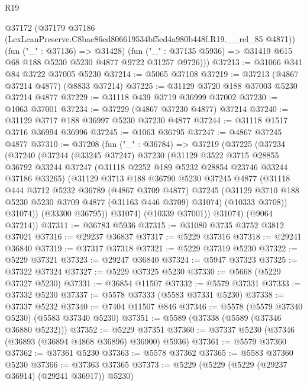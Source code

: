 \begin{lexlean}{R19}
\begin{coremodule}
      @37172
        (@37179 @37186 (LexLeanPreserve.C8bae86ed806619534bf5ed4a980b448f.R19.__rel_85 @4871))
        (fun ("_" : @37136) => @31428)
        (fun ("_" : @37135 @5936) => @31419 @615 @68 @188 @5230 @5230 @4877 @9722 @31257 @9726)))
@37213 := @31066 @341 @84 @3722 @37005 @5230
@37214 := @5065 @37108
@37219 := @37213 (@4867 @37214 @4877) (@8833 @37214)
@37225 := @31129 @3720 @188 @37003 @5230 @37214 @4877
@37229 := @31118 @439 @3719 @36999 @37002
@37230 := @1063 @37001
@37234 := @37229 (@4867 @37230 @4877) @37214
@37240 := @31129 @3717 @188 @36997 @5230 @37230 @4877
@37244 := @31118 @1517 @3716 @36994 @36996
@37245 := @1063 @36795
@37247 := @4867 @37245 @4877
@37310 := @37208
    (fun ("_" : @36784) =>
    @37219
      (@37225
        (@37234
          (@37240
            (@37244
              (@33245 @37247)
              @37230
              (@31129
                @3522
                @3715
                @28855
                @36792
                @33244
                @37247
                (@31118 @2252 @189 @5232 @28854 @23746 @33244 @37186 @33265)
                (@31129
                  @3713
                  @188
                  @36790
                  @5230
                  @37245
                  @4877
                  (@31118
                    @444
                    @3712
                    @5232
                    @36789
                    (@4867 @3709 @4877)
                    @37245
                    (@31129 @3710 @188 @5230 @5230 @3709 @4877 (@31163 @446 @3709) @31074)
                    (@10333 @3708))
                  @31074))
              (@33300 @36795))
            @31074)
          (@10339 @37001))
        @31074)
      (@9064 @37214))
@37311 := @36783 @5936
@37315 := @31080 @3735 @3752 @3812 @37021
@37316 := @29237 @36837
@37317 := @5229 @37316
@37318 := @29241 @36840
@37319 := @37317 @37318
@37321 := @5229 @37319 @5230
@37322 := @5229 @37321
@37323 := @29247 @36840
@37324 := @5947 @37323
@37325 := @37322 @37324
@37327 := @5229 @37325 @5230
@37330 := @5668 (@5229 @37327 @5230)
@37331 := @36854 @11507
@37332 := @5579 @37331
@37333 := @37332 @5230
@37337 := @5578 @37333 (@5583 @37331 @5230)
@37338 := @37337 @5232
@37340 := @7404 @11507 @846
@37346 := @5578 (@5579 @37340 @5230) (@5583 @37340 @5230)
@37351 := @5589 (@37338 (@5589 (@37346 @36880 @5232)))
@37352 := @5229 @37351
@37360 := @37337 @5230 (@37346 (@36893 (@36894 @4868 @36896) @36900) @5936)
@37361 := @5579 @37360
@37362 := @37361 @5230
@37363 := @5578 @37362
@37365 := @5583 @37360 @5230
@37366 := @37363 @37365
@37373 := @5229 (@5229 (@5229 (@29237 @36914) (@29241 @36917)) @5230)

\end{coremodule}
\end{lexlean}
